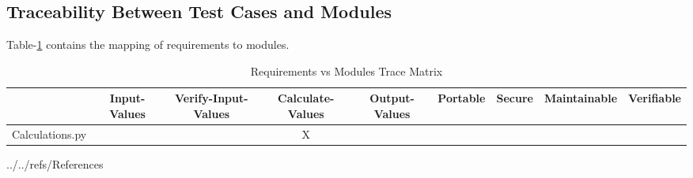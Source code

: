\documentclass[12pt, titlepage]{article}
\begin{document}
					
\subsection{Traceability Between Test Cases and Modules}

				
Table-\ref{tblTrace2} contains the mapping of requirements to modules.
  
\begin{table}[]
\begin{adjustbox}{width=1.29\textwidth}
\begin{tabular}{c|c|c|c|c|c|c|c|c|}
 & Input-Values & Verify-Input-Values & Calculate-Values & Output-Values & Portable & Secure & Maintainable & Verifiable \\ \hline
Calculations.py &  &  & X  &   &  &  &  &  \\
\end{tabular}
\end{adjustbox}
\caption{Requirements vs Modules Trace Matrix}
\label{tblTrace2}
\end{table}



 {../../refs/References}







\end{document}
